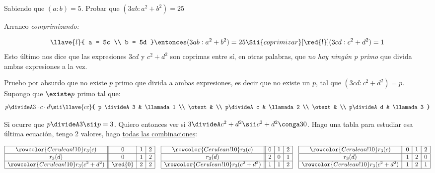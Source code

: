 \begin{enunciado}{\ejExtra}
  Sabiendo que $(a:b) = 5$. Probar que $(3ab: a^2 + b^2) = 25$
\end{enunciado}

Arranco \textit{comprimizando: }\par
$$
  \llave{l}{ a = 5c \\
    b = 5d
  }
  \entonces
  (3ab : a^2 + b^2) = 25
  \Sii{coprimizar}[\red{!}]
  (3 cd : c^2 + d^2) = 1
$$
Esto último nos dice que las expresiones $3cd$ y $c^2 + d^2$ son coprimas entre
sí, en otras palabras, que \textit{no hay ningún p primo} que divida ambas expresiones
a la vez.\par
Pruebo por absurdo que no existe $p$ primo que divida a ambas expresiones, es decir
que no existe un $p$, tal que $(3cd : c^2 + d^2) = p$.
Supongo que $\existe p$ primo tal que:
$$
  p \divideA 3 \cdot c \cdot d
  \sii
  \llave{cc}{
    p \divideA 3 & \llamada1 \\
    \otext       &           \\
    p\divideA c  & \llamada2 \\
    \otext       &           \\
    p\divideA d  & \llamada3
  }
$$

Si ocurre que $p \divideA 3 \sii p = 3$. Quiero entonces ver si $3 \divideA c^2 + d^2 \sii c^2 + d^2 \conga3 0$. Hago
una tabla para estudiar esa última ecuación, tengo 2 valores, hago \underline{todas las combinaciones}:
\begin{center}
  $
    \begin{array}{|c||c|c|c|} \hline\rowcolor{Cerulean!10}
      r_3(c)         & 0       & 1 & 2 \\ \hline
      r_3(d)         & 0       & 1 & 2 \\ \hline\rowcolor{Cerulean!10}
      r_3(c^2 + d^2) & \red{0} & 2 & 2 \\ \hline
    \end{array}
    \quad
    \begin{array}{|c||c|c|c|} \hline\rowcolor{Cerulean!10}
      r_3(c)         & 0 & 1 & 2 \\ \hline
      r_3(d)         & 2 & 0 & 1 \\ \hline\rowcolor{Cerulean!10}
      r_3(c^2 + d^2) & 1 & 1 & 2 \\ \hline
    \end{array}
    \quad
    \begin{array}{|c||c|c|c|} \hline\rowcolor{Cerulean!10}
      r_3(c)         & 0 & 1 & 2 \\ \hline
      r_3(d)         & 1 & 2 & 0 \\ \hline\rowcolor{Cerulean!10}
      r_3(c^2 + d^2) & 1 & 2 & 1 \\ \hline
    \end{array}
  $
\end{center}

